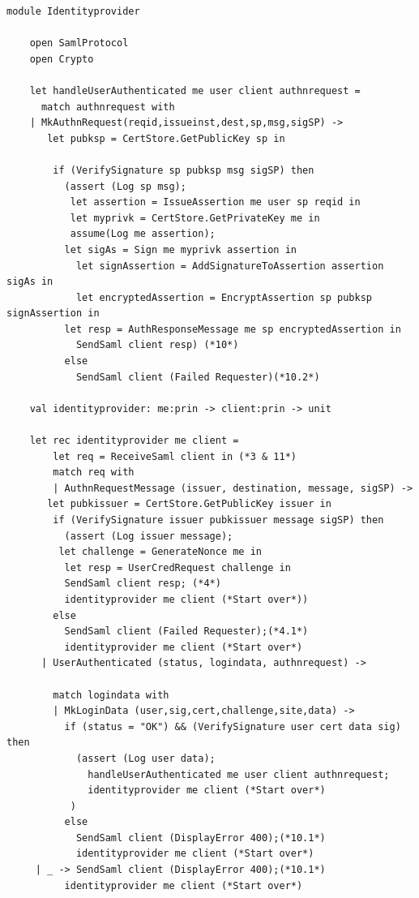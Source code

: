 \documentclass[twosided]{report}
\begin{document}
\begin{lstlisting}[style=fstar, caption={NemID identity provider implementation \cite{jacob}}, label={list:nemididp}]
	module Identityprovider

	open SamlProtocol
	open Crypto

	let handleUserAuthenticated me user client authnrequest =
	  match authnrequest with 
  	| MkAuthnRequest(reqid,issueinst,dest,sp,msg,sigSP) ->
   	   let pubksp = CertStore.GetPublicKey sp in
      
  	    if (VerifySignature sp pubksp msg sigSP) then
  	      (assert (Log sp msg);
 	       let assertion = IssueAssertion me user sp reqid in
 	       let myprivk = CertStore.GetPrivateKey me in
 	       assume(Log me assertion);
  	      let sigAs = Sign me myprivk assertion in
	        let signAssertion = AddSignatureToAssertion assertion sigAs in
	        let encryptedAssertion = EncryptAssertion sp pubksp 
signAssertion in
  	      let resp = AuthResponseMessage me sp encryptedAssertion in
	        SendSaml client resp) (*10*)
	      else
	        SendSaml client (Failed Requester)(*10.2*)

	val identityprovider: me:prin -> client:prin -> unit

	let rec identityprovider me client =
		let req = ReceiveSaml client in (*3 & 11*)
		match req with
		| AuthnRequestMessage (issuer, destination, message, sigSP) ->
 	   let pubkissuer = CertStore.GetPublicKey issuer in
	    if (VerifySignature issuer pubkissuer message sigSP) then
	      (assert (Log issuer message);
 	     let challenge = GenerateNonce me in
	      let resp = UserCredRequest challenge in
	      SendSaml client resp; (*4*)
	      identityprovider me client (*Start over*))
	    else
	      SendSaml client (Failed Requester);(*4.1*)
	      identityprovider me client (*Start over*)
	  | UserAuthenticated (status, logindata, authnrequest) ->
	
	    match logindata with 
	    | MkLoginData (user,sig,cert,challenge,site,data) ->
	      if (status = "OK") && (VerifySignature user cert data sig) then
	        (assert (Log user data);
	          handleUserAuthenticated me user client authnrequest;
	          identityprovider me client (*Start over*)
 	       )
	      else
	        SendSaml client (DisplayError 400);(*10.1*)
	        identityprovider me client (*Start over*)
 	 | _ -> SendSaml client (DisplayError 400);(*10.1*)
  	      identityprovider me client (*Start over*)
\end{lstlisting}
\end{document}
